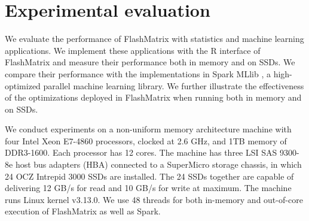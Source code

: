 \section{Experimental evaluation}
We evaluate the performance of FlashMatrix with statistics and machine learning
applications. We implement these applications with the R interface of FlashMatrix
and measure their performance both in memory and on SSDs. We compare their
performance with the implementations in Spark MLlib \cite{mllib},
a high-optimized parallel machine learning library. We further
illustrate the effectiveness of the optimizations deployed in FlashMatrix
when running both in memory and on SSDs.

We conduct experiments on a non-uniform memory architecture machine with
four Intel Xeon E7-4860 processors, clocked at 2.6 GHz, and 1TB memory of
DDR3-1600. Each processor has 12 cores. The machine has three LSI SAS 9300-8e
host bus adapters (HBA) connected to a SuperMicro storage chassis, in which
24 OCZ Intrepid 3000 SSDs are installed. The 24 SSDs together are capable of
delivering 12 GB/s for read and 10 GB/s for write at maximum. The machine runs
Linux kernel v3.13.0. We use 48 threads for both in-memory and out-of-core
execution of FlashMatrix as well as Spark.

